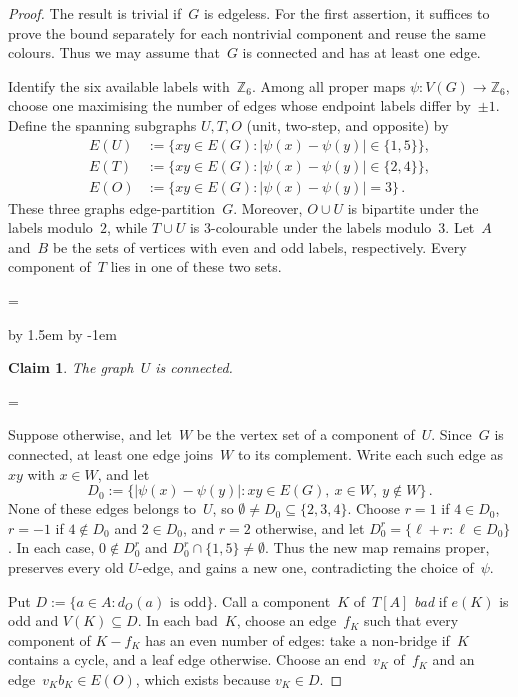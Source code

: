 \documentclass[12pt,reqno,a4paper]{amsart}
\makeatletter
\newtheorem*{claim}{Claim}
\renewcommand{\qedsymbol}{\ensuremath{\blacksquare}}
\newenvironment{nestedproofblock}
  {%
    \nestedblockparskip=\parskip
    \parskip=0pt%
    \par
    \advance\@totalleftmargin by 1.5em%
    \advance\linewidth by -1em%
    \parshape\@ne\@totalleftmargin\linewidth
    \def\thm@space@setup{%
      \thm@preskip=5pt%
      \thm@postskip=3pt%
    }%
  }
  {%
    \par
  }
\newenvironment{nestedproof}[1][\proofname]
  {%
    \par
    \pushQED{\qed}%
    \renewcommand{\qedsymbol}{\ensuremath{\blacklozenge}}%
    \normalfont
    \topsep=0pt\relax
    \partopsep=0pt\relax
    \trivlist
    \item[\hskip\labelsep\itshape#1\@addpunct{.}]\ignorespaces
    \parskip=\nestedblockparskip
  }
  {%
    \parskip=0pt%
    \popQED
    \endtrivlist
    \@endpefalse
  }
\makeatother
\begin{document}
\begin{proof}
  The result is trivial if~$G$ is edgeless.
  For the first assertion, it suffices to prove the bound separately for each
  nontrivial component and reuse the same colours. 
  Thus we may assume that~$G$ is connected and has at least one edge.

  Identify the six available labels with~$\mathbb Z_6$.
  Among all proper maps $\psi \colon V(G) \to \mathbb Z_6$, choose one
  maximising the number of edges whose endpoint labels differ by~$\pm 1$.
  Define the spanning subgraphs $U,T,O$ (unit, two-step, and opposite) by
  \begin{align*}
    E(U) & := \{xy \in E(G) \colon |\psi(x) - \psi(y)| \in \{1,5\}\},\\
    E(T) & := \{xy \in E(G) \colon |\psi(x) - \psi(y)| \in \{2,4\}\},\\
    E(O) & := \{xy \in E(G) \colon |\psi(x) - \psi(y)| = 3\} \, .
  \end{align*}
  These three graphs edge-partition~$G$. 
  Moreover, $O \cup U$ is bipartite under the labels modulo~$2$, while $T \cup
  U$ is $3$-colourable under the labels modulo~$3$.
  Let~$A$ and~$B$ be the sets of vertices with even and odd labels,
  respectively.
  Every component of~$T$ lies in one of these two sets.

  \begin{nestedproofblock}
  \begin{claim}
    The graph~$U$ is connected.
  \end{claim}
  \begin{nestedproof}[Proof of the claim]
    Suppose otherwise, and let~$W$ be the vertex set of a component of~$U$.
    Since~$G$ is connected, at least one edge joins~$W$ to its complement.
    Write each such edge as~$xy$ with $x \in W$, and let
    \[ 
      D_0 := \{|\psi(x) - \psi(y)| \colon xy \in E(G),\ x \in W,\ y \notin W\} \,.
    \]
    None of these edges belongs to~$U$, so $\emptyset \neq D_0 \subseteq
    \{2,3,4\}$.
    Choose $r = 1$ if $4 \in D_0$, $r = -1$ if $4 \notin D_0$ and $2 \in D_0$,
    and $r = 2$ otherwise, and let $D_0^r = \{\ell + r \colon \ell \in D_0\}$.
    In each case, $0 \notin D_0^r$ and $D_0^r \cap \{1,5\} \neq \emptyset$.
    Thus the new map remains proper, preserves every old $U$-edge, and gains a
    new one, contradicting the choice of~$\psi$.
  \end{nestedproof}
  \end{nestedproofblock}

  Put $D := \{a \in A \colon d_O(a) \text{ is odd}\}$.
  Call a component~$K$ of~$T[A]$ \emph{bad} if $e(K)$ is odd and $V(K)
  \subseteq D$.
  In each bad~$K$, choose an edge~$f_K$ such that every component of $K-f_K$
  has an even number of edges: take a non-bridge if~$K$ contains a cycle, and a
  leaf edge otherwise.
  Choose an end~$v_K$ of~$f_K$ and an edge~$v_Kb_K \in E(O)$, which exists
  because $v_K \in D$.


\end{proof}
\end{document}
